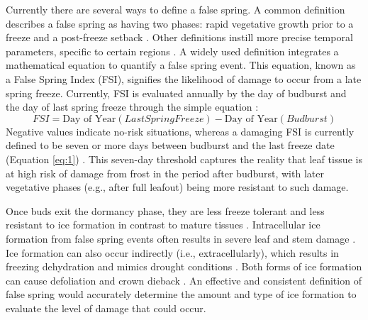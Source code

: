 \documentclass{article}\usepackage[]{graphicx}\usepackage[]{color}
\begin{document}
Currently there are several ways to define a false spring. A common definition describes a false spring as having two phases: rapid vegetative growth prior to a freeze and a post-freeze setback \citep{Gu2008}. Other definitions instill more precise temporal parameters, specific to certain regions \citep[e.g., in][false spring for the Midwestern United States is defined as a warmer than average March, a freezing April, and enough growing degree days between budburst and the last freeze date]{Augspurger2013}. A widely used definition integrates a mathematical equation to quantify a false spring event. This equation, known as a False Spring Index (FSI), signifies the likelihood of damage to occur from a late spring freeze. Currently, FSI is evaluated annually by the day of budburst and the day of last spring freeze \citep[often calculated at -2.2$^{\circ}$C,][]{Schwartz1993} through the simple equation \citep{Marino2011}:
\begin{equation} \label{eq:1}
FSI = \text{Day of Year} (Last Spring Freeze) - \text{Day of Year} (Budburst)
\end{equation}
Negative values indicate no-risk situations, whereas a damaging FSI is currently defined to be seven or more days between budburst and the last freeze date (Equation \ref{eq:1}) \citep{Peterson2014}. This seven-day threshold captures the reality that leaf tissue is at high risk of damage from frost in the period after budburst, with later vegetative phases (e.g., after full leafout) being more resistant to such damage.%

Once buds exit the dormancy phase, they are less freeze tolerant and less resistant to ice formation in contrast to mature tissues \citep{ Lenz2013, Taschler2004, Vitasse2014a}. Intracellular ice formation from false spring events often results in severe leaf and stem damage \citep{Burke1976, Sakai1987}. Ice formation can also occur indirectly (i.e., extracellularly), which results in freezing dehydration and mimics drought conditions \citep{Beck2004, Hofmann2015, Pearce2001}. Both forms of ice formation can cause defoliation and crown dieback \citep{Gu2008}. An effective and consistent definition of false spring would accurately determine the amount and type of ice formation to evaluate the level of damage that could occur.
\end{document}
